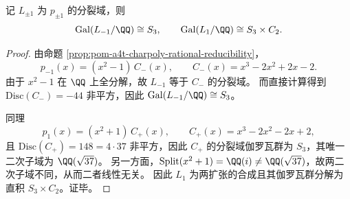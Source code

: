 \begin{proposition}[\texorpdfstring{$t=\pm1$}{t=±1} 退化点的分裂域结构]\label{prop:pom-a4t-charpoly-degenerate-galois}
记 \(L_{\pm1}\) 为 \(p_{\pm1}\) 的分裂域，则
\[
\mathrm{Gal}(L_{-1}/\QQ)\cong S_3,\qquad
\mathrm{Gal}(L_{1}/\QQ)\cong S_3\times C_2.
\]
\end{proposition}
\begin{proof}
由命题 \ref{prop:pom-a4t-charpoly-rational-reducibility}，
\[
p_{-1}(x)=(x^2-1)\,C_{-}(x),\qquad C_{-}(x)=x^3-2x^2+2x-2.
\]
由于 \(x^2-1\) 在 \(\QQ\) 上全分解，故 \(L_{-1}\) 等于 \(C_{-}\) 的分裂域。
而直接计算得到 \(\mathrm{Disc}(C_{-})=-44\) 非平方，因此 \(\mathrm{Gal}(L_{-1}/\QQ)\cong S_3\)。
\par
同理
\[
p_{1}(x)=(x^2+1)\,C_{+}(x),\qquad C_{+}(x)=x^3-2x^2-2x+2,
\]
且 \(\mathrm{Disc}(C_{+})=148=4\cdot 37\) 非平方，因此 \(C_{+}\) 的分裂域伽罗瓦群为 \(S_3\)，其唯一二次子域为 \(\QQ(\sqrt{37})\)。
另一方面，\(\mathrm{Split}(x^2+1)=\QQ(i)\neq \QQ(\sqrt{37})\)，故两二次子域不同，从而二者线性无关。
因此 \(L_{1}\) 为两扩张的合成且其伽罗瓦群分解为直积 \(S_3\times C_2\)。证毕。
\end{proof}



\endinput
